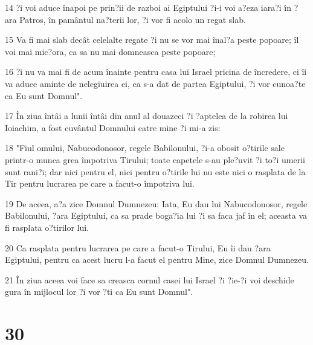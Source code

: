 \par 14 ?i voi aduce înapoi pe prin?ii de razboi ai Egiptului ?i-i voi a?eza iara?i în ?ara Patros, în pamântul na?terii lor, ?i vor fi acolo un regat slab.
\par 15 Va fi mai slab decât celelalte regate ?i nu se vor mai înal?a peste popoare; îl voi mai mic?ora, ca sa nu mai domneasca peste popoare;
\par 16 ?i nu va mai fi de acum înainte pentru casa lui Israel pricina de încredere, ci îi va aduce aminte de nelegiuirea ei, ca s-a dat de partea Egiptului, ?i vor cunoa?te ca Eu sunt Domnul".
\par 17 În ziua întâi a lunii întâi din anul al douazeci ?i ?aptelea de la robirea lui Ioiachim, a fost cuvântul Domnului catre mine ?i mi-a zis:
\par 18 "Fiul omului, Nabucodonosor, regele Babilonului, ?i-a obosit o?tirile sale printr-o munca grea împotriva Tirului; toate capetele s-au ple?uvit ?i to?i umerii sunt rani?i; dar nici pentru el, nici pentru o?tirile lui nu este nici o rasplata de la Tir pentru lucrarea pe care a facut-o împotriva lui.
\par 19 De aceea, a?a zice Domnul Dumnezeu: Iata, Eu dau lui Nabucodonosor, regele Babilonului, ?ara Egiptului, ca sa prade boga?ia lui ?i sa faca jaf în el; aceasta va fi rasplata o?tirilor lui.
\par 20 Ca rasplata pentru lucrarea pe care a facut-o Tirului, Eu îi dau ?ara Egiptului, pentru ca acest lucru l-a facut el pentru Mine, zice Domnul Dumnezeu.
\par 21 În ziua aceea voi face sa creasca cornul casei lui Israel ?i ?ie-?i voi deschide gura în mijlocul lor ?i vor ?ti ca Eu sunt Domnul".

\chapter{30}

